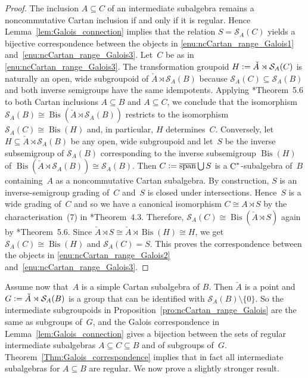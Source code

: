 \documentclass[a4paper]{amsart}
\theoremstyle{plain}
\theoremstyle{definition}
\theoremstyle{remark}
\numberwithin{theorem}{section}
\numberwithin{equation}{section}
\DeclareMathOperator{\Bis}{Bis}%
\DeclareMathOperator*{\clsp}{\overline{span}} %
\newcommand*{\nb}{\nobreakdash}
\newcommand*{\Cst}{\textup C^*}%
\newcommand*{\Slice}{\mathcal S}%
\newcommand*{\defeq}{\mathrel{\vcentcolon=}}%
\begin{document}
\begin{proof}
  The inclusion \(A\subseteq C\) of an intermediate subalgebra remains
  a noncommutative Cartan inclusion if and only if it is regular.
  Hence Lemma~\ref{lem:Galois_connection} implies that the relation
  \(S=\Slice_A(C)\) yields a bijective correspondence between
  the objects in \ref{enu:ncCartan_range_Galois1} and~\ref{enu:ncCartan_range_Galois3}.
  Let~\(C\) be as in \ref{enu:ncCartan_range_Galois3}.
  The transformation groupoid \(H\defeq \check{A}\rtimes \Slice_A(C)\) is naturally an
  open, wide  subgroupoid of \(\check{A}\rtimes \Slice_A(B)\) because
  \(\Slice_A(C) \subseteq \Slice_A(B)\) and both inverse semigroups
  have the same idempotents.
  Applying \cite{Kwasniewski-Meyer:Cartan}*{Theorem~5.6}  to both
  Cartan inclusions \(A\subseteq B\) and \(A\subseteq C\), we conclude
  that the isomorphism \(\Slice_A(B) \cong \Bis(\check{A}\rtimes
  \Slice_A(B))\) restricts to the isomorphism \(\Slice_A(C) \cong
  \Bis(H)\) and, in particular, \(H\) determines~\(C\).
  Conversely, let \(H\subseteq \check{A}\rtimes \Slice_A(B)\) be any
  open, wide  subgroupoid and let~\(S\) be the inverse subsemigroup of
  \(\Slice_A(B)\) corresponding to the inverse subsemigroup
  \(\Bis(H)\) of  \(\Bis(\check{A}\rtimes  \Slice_A(B))\cong
  \Slice_A(B)\).
  Then \(C\defeq \clsp\bigcup S\) is a \(\Cst\)\nb-subalgebra of~\(B\)
  containing~\(A\) as a noncommutative Cartan subalgebra.
  By construction, \(S\) is an inverse-semigroup grading of~\(C\)
  and~\(S\) is closed under intersections.
  Hence~\(S\) is a wide grading of~\(C\) and so we have a canonical
  isomorphism \(C\cong A\rtimes S\) by the characterisation~(7) in 	
  \cite{Kwasniewski-Meyer:Cartan}*{Theorem~4.3}.
  Therefore, \(\Slice_A(C) \cong \Bis(\check{A}\rtimes S)\) again by
  \cite{Kwasniewski-Meyer:Cartan}*{Theorem~5.6}.
  Since \(\check{A}\rtimes S\cong \check{A}\rtimes \Bis(H)\cong H \),
  we get \(\Slice_A(C) \cong\Bis(H)\) and \(\Slice_A(C)=S\).
  This proves the correspondence between the objects in
  \ref{enu:ncCartan_range_Galois2}
  and~\ref{enu:ncCartan_range_Galois3}.
\end{proof}

Assume now that~\(A\) is a  simple Cartan subalgebra of \(B\).
Then \(\check{A}\) is a point and \(G\defeq\check{A}\rtimes \Slice_A(B)\) is
a group that can be identified with \(\Slice_A(B)\setminus \{0\}\).
So the intermediate subgroupoids in
Proposition~\ref{pro:ncCartan_range_Galois} are the same as subgroups
of~\(G\), and the Galois correspondence in
Lemma~\ref{lem:Galois_connection} gives a bijection between the sets
of regular intermediate subalgebras \(A\subseteq C\subseteq B\) and of
subgroups of~\(G\).
Theorem~\ref{Thm:Galois_correspondence}
implies that in fact  all intermediate subalgebras for \(A\subseteq B\) are
regular.
We now prove a slightly stronger result.
\end{document}
